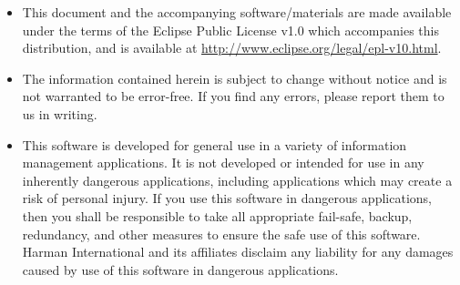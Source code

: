 \documentclass[a4paper,10pt]{scrreprt}
\newlength{\XdocItemIndent}
\begin{document}
\setlength{\XdocItemIndent}{\textwidth}
\begin{itemize}
\addtolength{\XdocItemIndent}{-2.5em}
\item \begin{minipage}[t]{\XdocItemIndent}
This document and the accompanying software/materials
		are made available under the terms of the Eclipse Public License v1.0
		which accompanies this distribution, and is available at
		\href{http://www.eclipse.org/legal/epl-v10.html}{http://www.eclipse.org/legal/epl-v10.html}.

\end{minipage}
\item \begin{minipage}[t]{\XdocItemIndent}
The information contained herein is subject to change without notice
		and is not warranted to be error-free. If you find any errors, please report
		them to us in writing.

\end{minipage}
\item \begin{minipage}[t]{\XdocItemIndent}
This software is developed for general use in a variety of information management
		applications. It is not developed or intended for use in any inherently dangerous
		applications, including applications which may create a risk of personal injury.
		If you use this software in dangerous applications, then you shall be responsible
		to take all appropriate fail-safe, backup, redundancy, and other measures to ensure
		the safe use of this software. Harman International and its affiliates disclaim
		any liability for any damages caused by use of this software in dangerous applications.

\end{minipage}
\end{itemize}
\addtolength{\XdocItemIndent}{2.5em}
\end{document}
